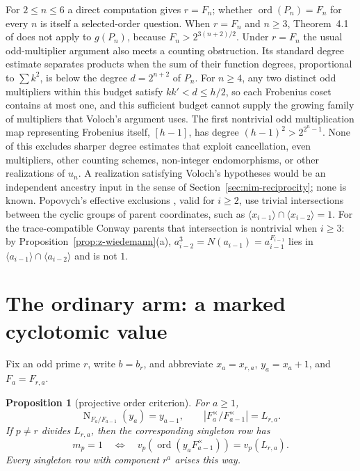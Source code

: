 \documentclass[11pt]{article}
\newtheorem{proposition}[theorem]{Proposition}
\theoremstyle{definition}
\theoremstyle{remark}
\begin{document}
For $2\leq n\leq6$ a direct computation gives $r=F_n$; whether
$\operatorname{ord}(P_n)=F_n$ for every $n$ is itself a selected-order
question.  When $r=F_n$ and $n\geq3$, Theorem~4.1 of \cite{voloch2010} does
not apply to $g(P_n)$, because $F_n>2^{3(n+2)/2}$.  Under $r=F_n$ the usual
odd-multiplier argument also meets a counting obstruction.  Its standard
degree estimate separates products when the sum of their function degrees,
proportional to $\sum k^2$, is below the degree $d=2^{n+2}$ of $P_n$.  For
$n\geq4$, any two distinct odd multipliers within this budget satisfy
$kk'<d\leq h/2$, so each Frobenius coset contains at most one, and this
sufficient budget cannot supply the growing family of multipliers that
Voloch's argument uses.  The first nontrivial odd multiplication map
representing Frobenius itself, $[h-1]$, has degree $(h-1)^2>2^{2^n-1}$.
None of this excludes sharper degree estimates that exploit cancellation,
even multipliers, other counting schemes, non-integer endomorphisms, or other
realizations of $u_n$.  A realization satisfying Voloch's
hypotheses would be an independent ancestry input in the sense of
Section~\ref{sec:nim-reciprocity}; none is known.  Popovych's effective
exclusions \cite[Theorem~2]{popovych2015}, valid for $i\geq2$, use trivial
intersections between the cyclic groups of parent coordinates, such as
$\langle x_{i-1}\rangle\cap\langle x_{i-2}\rangle=1$.  For the trace-compatible Conway parents
that intersection is nontrivial when $i\geq3$: by
Proposition~\ref{prop:z-wiedemann}(a),
$a_{i-2}^3=N(a_{i-1})=a_{i-1}^{F_{i-1}}$ lies in
$\langle a_{i-1}\rangle\cap\langle a_{i-2}\rangle$ and is not $1$.

\section{The ordinary arm: a marked cyclotomic value}\label{sec:o}

Fix an odd prime $r$, write $b=b_r$, and abbreviate
$x_a=x_{r,a}$, $y_a=x_a+1$, and $F_a=F_{r,a}$.

\begin{proposition}[projective order criterion]\label{prop:o-projective}
For $a\geq1$,
\[
 \operatorname N_{F_a/F_{a-1}}(y_a)=y_{a-1},
 \qquad
 |F_a^{\times}/F_{a-1}^{\times}|=L_{r,a}.
\]
If $p\ne r$ divides $L_{r,a}$, then the corresponding singleton row has
\[
 m_p=1
 \quad\Longleftrightarrow\quad
 v_p\!\left(\operatorname{ord}
 (y_aF_{a-1}^{\times})\right)=v_p(L_{r,a}).
\]
Every singleton row with component $r^a$ arises this way.
\end{proposition}
\end{document}
